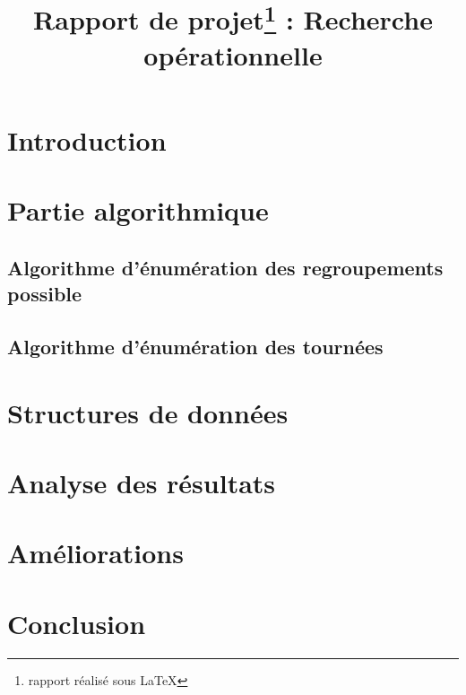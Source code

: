 \documentclass[a4paper,sffamily,12pt]{article}
\title{\vspace{\fill}\LARGE\bfseries\sffamily Rapport de projet\protect\footnote{rapport réalisé sous \LaTeX} : Recherche opérationnelle\vspace{\fill}}
\begin{document}
	\date{} %
	\maketitle %

	\thispagestyle{fancy} %
	
	\newpage
			
	\renewcommand{\contentsname}{Sommaire}
	\tableofcontents
	
	\newpage
	
	\section{Introduction}
	
		\vspace{0.5cm}

	\section{Partie algorithmique}
	
		\vspace{0.5cm}
		
		\subsection{Algorithme d'énumération des regroupements possible}
			
			\vspace{0.5cm}
		
		
	
		
		\subsection{Algorithme d'énumération des tournées}	
			
			\vspace{0.5cm}
	
	
	
			
	\section{Structures de données}		
					
			\vspace{0.5cm}
		
		
		
			
	\section{Analyse des résultats}
	
		\vspace{0.5cm}		
			
			
	\section{Améliorations}
	
		\vspace{0.5cm}		
			
			
			
	\section{Conclusion}
	
		\vspace{0.5cm}
										
\end{document}
